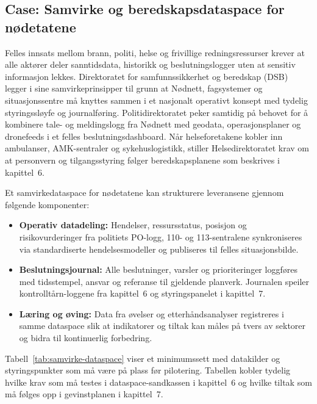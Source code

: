 \subsection{Case: Samvirke og beredskapsdataspace for nødetatene}
Felles innsats mellom brann, politi, helse og frivillige redningsressurser krever at alle aktører deler sanntidsdata, historikk og beslutningslogger uten at sensitiv informasjon lekkes. Direktoratet for samfunnssikkerhet og beredskap (DSB) legger i sine samvirkeprinsipper til grunn at Nødnett, fagsystemer og situasjonssentre må knyttes sammen i et nasjonalt operativt konsept med tydelig styringssløyfe og journalføring.\citep{dsb2023samvirke} Politidirektoratet peker samtidig på behovet for å kombinere tale- og meldingslogg fra Nødnett med geodata, operasjonsplaner og dronefeeds i et felles beslutningsdashboard.\citep{politidirektoratet2022nodnett} Når helseforetakene kobler inn ambulanser, AMK-sentraler og sykehuslogistikk, stiller Helsedirektoratet krav om at personvern og tilgangsstyring følger beredskapsplanene som beskrives i kapittel~6.\citep{helsedir2022akutt}

Et samvirkedataspace for nødetatene kan strukturere leveransene gjennom følgende komponenter:
\begin{itemize}
    \item \textbf{Operativ datadeling:} Hendelser, ressursstatus, posisjon og risikovurderinger fra politiets PO-logg, 110- og 113-sentralene synkroniseres via standardiserte hendelsesmodeller og publiseres til felles situasjonsbilde.
    \item \textbf{Beslutningsjournal:} Alle beslutninger, varsler og prioriteringer loggføres med tidsstempel, ansvar og referanse til gjeldende planverk. Journalen speiler kontrolltårn-loggene fra kapittel~6 og styringspanelet i kapittel~7.
    \item \textbf{Læring og øving:} Data fra øvelser og etterhåndsanalyser registreres i samme dataspace slik at indikatorer og tiltak kan måles på tvers av sektorer og bidra til kontinuerlig forbedring.
\end{itemize}

Tabell~\ref{tab:samvirke-dataspace} viser et minimumssett med datakilder og styringspunkter som må være på plass før pilotering. Tabellen kobler tydelig hvilke krav som må testes i dataspace-sandkassen i kapittel~6 og hvilke tiltak som må følges opp i gevinstplanen i kapittel~7.

